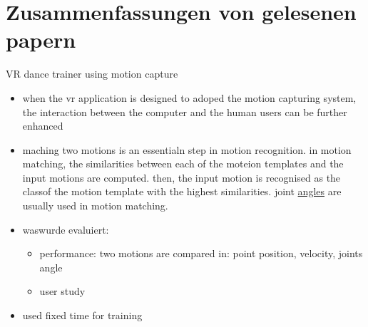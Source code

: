 \section{Zusammenfassungen von gelesenen papern}
VR dance trainer using motion capture
\begin{itemize}
	\item when the vr application is designed to adoped the motion capturing system, the interaction between the computer and the human users can be further enhanced
	\item maching two motions is an essentialn step in motion recognition. in motion matching, the similarities between each of the moteion templates and the input motions are computed. then, the input motion is recognised as the classof the motion template with the highest similarities. joint \underline{angles} are usually used in motion matching.
	\item waswurde evaluiert:
	\begin{itemize}
		\item performance: two motions are compared in: point position, velocity, joints angle
		\item user study
	\end{itemize}
	\item used fixed time for training 
\end{itemize}
